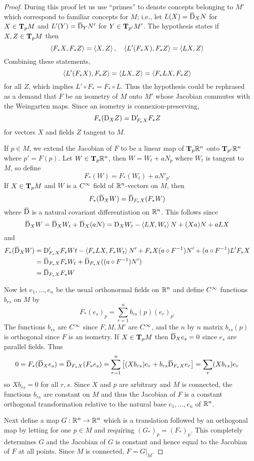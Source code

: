 \documentclass[../main]{subfiles}
\begin{document}
\begin{proof}
During this proof let us use ``primes'' to denote concepts belonging to $M'$ which correspond to familiar concepts for $M$; i.e., let $L(X)=\covariant_XN$ for $X\in\ts Mp$ and $L'(Y)=\covariant_YN'$ for $Y\in\ts{M'}{p'}$. The hypothesis states if $X,Z\in\ts Mp$ then
\[\ip{F_\ast X}{F_\ast Z} = \ip XZ,
\quad \ip{L'(F_\ast X)}{F_\ast Z} = \ip{LX}{Z}\]
Combining these statements,
\[\ip{L'(F_\ast X)}{F_\ast Z} = \ip{LX}{Z} = \ip{F_\ast LX}{F_\ast Z}\]
for all $Z$, which implies $L'\circ F_\ast =F_\ast \circ L$. Thus the hypothesis could be rephrased as a demand that $F$ be an isometry of $M$ onto $M'$ whose Jacobian commutes with the Weingarten maps. Since an isometry is connexion-preserving, \[F_\ast (\D_XZ)=\D'_{F_\ast X}F_\ast Z\]
for vectors $X$ and fields $Z$ tangent to $M$.

If $p\in M$, we extend the Jacobian of $F$ to be a linear map of $\ts{\bR^n}{p}$ onto $\ts{\bR^n}{p'}$ where $p'=F(p)$. Let $W\in\ts{\bR^n}{p}$, then $W=W_t+aN_p$ where $W_t$ is tangent to $M$, so define
\[F_\ast (W) = F_\ast (W_t) + aN'_{p'}\]
If $X\in\ts Mp$ and $W$ is a $\CInfty$ field of $\bR^n$-vectors on $M$, then
\[F_\ast (\covariant_XW) = \covariant_{F_\ast X}(F_\ast W)\]
where $\covariant$ is a natural covariant differentiation on $\bR^n$. This follows since
\[\covariant_XW = \covariant_XW_t+\covariant_X(aN) = \D_XW_t - \ip{LX}{W_t}N + (Xa)N + aLX\]
and
\begin{align*}
    F_\ast (\covariant_XW) &= \D'_{F_\ast X}F_\ast Wt - \ip{F_\ast LX}{F_\ast W_t}N' + F_\ast X(a\circ F\inv)N' + (a\circ F\inv)L'F_\ast X \\
    &= \covariant_{F_\ast X}F_\ast W_t + \covariant_{F_\ast X}((a\circ F\inv)N') \\
    &= \covariant_{F_\ast X}F_\ast W
\end{align*}

Now let $e_1,\ldots,e_n$ be the usual orthonormal fields on $\bR^n$ and define $\CInfty$ functions $b_{rs}$ on $M$ by
\[F_\ast (e_s)_p = \sum_{r=1}^n b_{rs}(p)(e_r)_{p'}\]
The functions $b_{rs}$ are $\CInfty$ since $F,M,M'$ are $\CInfty$, and the $n$ by $n$ matrix $b_{rs}(p)$ is orthogonal since $F$ is an isometry. If $X\in\ts Mp$ then $\covariant_Xe_s=0$ since $e_s$ are parallel fields. Thus
\[0 = F_\ast (\covariant_Xe_s) = \covariant_{F_\ast X}(F_\ast e_s) = \sum_{r=1}^n\sbr{(Xb_{rs})e_r+b_{rs}\covariant_{F_\ast X}e_r} = \sum_r(Xb_{rs})e_r\]
so $Xb_{rs}=0$ for all $r,s$. Since $X$ and $p$ are arbitrary and $M$ is connected, the functions $b_{rs}$ are constant on $M$ and thus the Jacobian of $F$ is a constant orthogonal transformation relative to the natural base $e_1,\ldots,e_n$ of $\bR^n$.

Next define a map $G:\bR^n\functionMaps\bR^n$ which is a translation followed by an orthogonal map by letting for one $p\in M$ and requiring $(G_\ast )_p=(F_\ast )_p$. This completely determines $G$ and the Jacobian of $G$ is constant and hence equal to the Jacobian of $F$ at all points. Since $M$ is connected, $F=G|_M$.
\end{proof}
\end{document}
